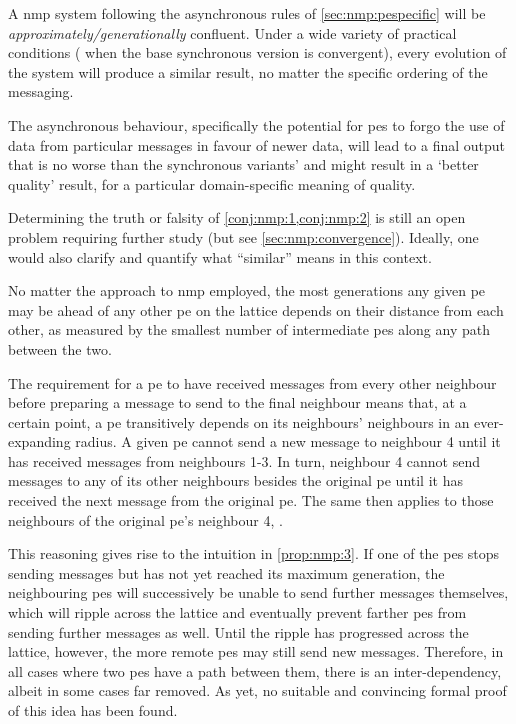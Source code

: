 \begin{conjecture}\label{conj:nmp:1}
A \gls{nmp} system following the asynchronous rules of \cref{sec:nmp:pespecific} will be \emph{approximately/generationally} confluent.  Under a wide variety of practical conditions (\eg{} when the base synchronous version is convergent), every evolution of the system will produce a similar result, no matter the specific ordering of the messaging.
\end{conjecture}

\begin{conjecture}\label{conj:nmp:2}
    The asynchronous behaviour, specifically the potential for \glspl{pe} to forgo the use of data from particular messages in favour of newer data, will lead to a final output that is no worse than the synchronous variants' and might result in a `better quality' result, for a particular domain-specific meaning of quality.
\end{conjecture}

Determining the truth or falsity of \cref{conj:nmp:1,conj:nmp:2} is still an open problem requiring further study (but see \cref{sec:nmp:convergence}).  Ideally, one would also clarify and quantify what ``similar'' means in this context.

\begin{proposition}\label{prop:nmp:3}
    No matter the approach to \gls{nmp} employed, the most generations any given \gls{pe} may be ahead of any other \gls{pe} on the lattice depends on their distance from each other, as measured by the smallest number of intermediate \glspl{pe} along any path between the two.
\end{proposition}

The requirement for a \gls{pe} to have received messages from every other neighbour before preparing a message to send to the final neighbour means that, at a certain point, a \gls{pe} transitively depends on its neighbours' neighbours in an ever-expanding radius.  A given \gls{pe} cannot send a new message to neighbour 4 until it has received messages from neighbours 1-3.  In turn, neighbour 4 cannot send messages to any of its other neighbours besides the original \gls{pe} until it has received the next message from the original \gls{pe}.  The same then applies to those neighbours of the original \gls{pe}'s neighbour 4, \etc{}.

This reasoning gives rise to the intuition in \cref{prop:nmp:3}.  If one of the \glspl{pe} stops sending messages but has not yet reached its maximum generation, the neighbouring \glspl{pe} will successively be unable to send further messages themselves, which will ripple across the lattice and eventually prevent farther \glspl{pe} from sending further messages as well.  Until the ripple has progressed across the lattice, however, the more remote \glspl{pe} may still send new messages.  Therefore, in all cases where two \glspl{pe} have a path between them, there is an inter-dependency, albeit in some cases far removed.  As yet, no suitable and convincing formal proof of this idea has been found.

